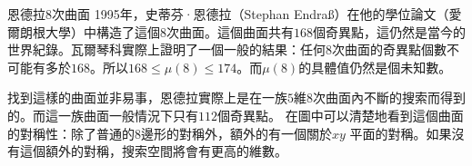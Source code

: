 \begin{surferPage}{恩德拉8次曲面}
1995年，史蒂芬·恩德拉（Stephan Endraß）在他的學位論文（愛爾朗根大學）中構造了這個$8$次曲面。這個曲面共有$168$個奇異點，這仍然是當今的世界紀錄。瓦爾琴科實際上證明了一個一般的結果：任何$8$次曲面的奇異點個數不可能有多於$168$。所以$168 \le \mu(8) \le 174$。而$\mu(8)$的具體值仍然是個未知數。

找到這樣的曲面並非易事，恩德拉實際上是在一族$5$維$8$次曲面內不斷的搜索而得到的。而這一族曲面一般情況下只有$112$個奇異點。
在圖中可以清楚地看到這個曲面的對稱性：除了普通的$8$邊形的對稱外，額外的有一個關於$xy$ 平面的對稱。如果沒有這個額外的對稱，搜索空間將會有更高的維數。
\end{surferPage}

